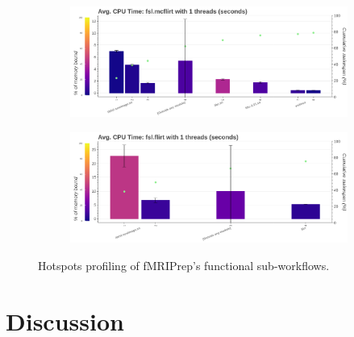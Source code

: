 \documentclass[conference]{IEEEtran}
\begin{document}
\begin{figure}[ht!]
	\centering
	\begin{subfigure}[t]{0.49\textwidth}
		\caption{}
		\label{subfig:hotspots-fsl-mcflirt}
		\includegraphics[width=\textwidth]{figures/hotspots-1thread-fsl-mcflirt.png}
	\end{subfigure}
	\hfill
	\begin{subfigure}[t]{0.49\textwidth}
		\caption{}
		\label{subfig:hotspots-fsl-flirt}

		\includegraphics[width=\textwidth]{figures/hotspots-1thread-fsl-flirt.png}
	\end{subfigure}
	\caption{Hotspots profiling of fMRIPrep's functional sub-workflows.}
	\label{fig:hotspots-fmriprep-func-subworkflow}														
	
\end{figure}

\section{Discussion}

\end{document}
